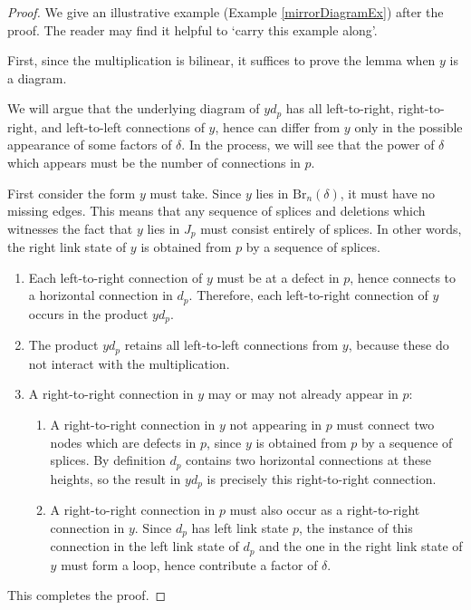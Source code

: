 \documentclass[12pt]{amsart}
\theoremstyle{plain}
\theoremstyle{definition} \newtheorem{definition}[theorem]{Definition}
\theoremstyle{plain}
\theoremstyle{plain} \newtheorem{proposition}[theorem]{Proposition}
\theoremstyle{plain} \newtheorem{conjecture}[theorem]{Conjecture}
\theoremstyle{plain} \newtheorem{corollary}[theorem]{Corollary}
\theoremstyle{remark} \newtheorem{claim}[theorem]{Claim}
\theoremstyle{remark} \newtheorem{remark}[theorem]{Remark}
\theoremstyle{remark} \newtheorem{example}[theorem]{Example}
\theoremstyle{remark} \newtheorem{comment}[theorem]{Comment}
\theoremstyle{definition} \newtheorem{question}[theorem]{Question}
\newcommand{\Brauer}{\mathrm{Br}}
\newcommand{\mOne}{splice}
\newcommand{\mTwo}{deletion}
\begin{document}
\begin{proof} We give an illustrative example (Example \ref{mirrorDiagramEx}) after the proof. The reader may find it helpful to `carry this example along'.

First, since the multiplication is bilinear, it suffices to prove the lemma when $y$ is a diagram.

We will argue that the underlying diagram of $y d_p$ has all left-to-right, right-to-right, and left-to-left connections of $y$, hence can differ from $y$ only in the possible appearance of some factors of $\delta$. In the process, we will see that the power of $\delta$ which appears must be the number of connections in $p$.

First consider the form $y$ must take. Since $y$ lies in $\Brauer_n(\delta)$, it must have no missing edges. This means that any sequence of {\mOne}s and {\mTwo}s which witnesses the fact that $y$ lies in $J_p$ must consist entirely of {\mOne}s. In other words, the right link state of $y$ is obtained from $p$ by a sequence of {\mOne}s.

\begin{enumerate}
    \item Each left-to-right connection of $y$ must be at a defect in $p$, hence connects to a horizontal connection in $d_p$. Therefore, each left-to-right connection of $y$ occurs in the product $y d_p$.
    \item The product $y d_p$ retains all left-to-left connections from $y$, because these do not interact with the multiplication.
    \item A right-to-right connection in $y$ may or may not already appear in $p$:
    \begin{enumerate}
        \item A right-to-right connection in $y$ not appearing in $p$ must connect two nodes which are defects in $p$, since $y$ is obtained from $p$ by a sequence of {\mOne}s. By definition $d_p$ contains two horizontal connections at these heights, so the result in $y d_p$ is precisely this right-to-right connection.
        \item A right-to-right connection in $p$ must also occur as a right-to-right connection in $y$. Since $d_p$ has left link state $p$, the instance of this connection in the left link state of $d_p$ and the one in the right link state of $y$ must form a loop, hence contribute a factor of $\delta$.
    \end{enumerate}
\end{enumerate}

This completes the proof. \end{proof}
\end{document}

